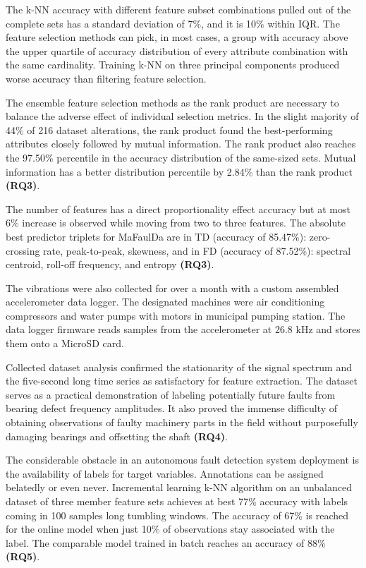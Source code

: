 The k-NN accuracy with different feature subset combinations pulled out of the complete sets has a standard deviation of 7\%, and it is 10\% within IQR. The feature selection methods can pick, in most cases, a group with accuracy above the upper quartile of accuracy distribution of every attribute combination with the same cardinality. Training k-NN on three principal components produced worse accuracy than filtering feature selection.

The ensemble feature selection methods as the rank product are necessary to balance the adverse effect of individual selection metrics. In the slight majority of 44\% of 216 dataset alterations, the rank product found the best-performing attributes closely followed by mutual information. The rank product also reaches the 97.50\% percentile in the accuracy distribution of the same-sized sets. Mutual information has a better distribution percentile by 2.84\% than the rank product \textbf{(RQ3)}. 

The number of features has a direct proportionality effect accuracy but at most 6\% increase is observed while moving from two to three features. The absolute best predictor triplets for MaFaulDa are in TD (accuracy of 85.47\%): zero-crossing rate, peak-to-peak, skewness, and in FD (accuracy of 87.52\%): spectral centroid, roll-off frequency, and entropy \textbf{(RQ3)}.

The vibrations were also collected for over a month with a custom assembled accelerometer data logger. The designated machines were air conditioning compressors and water pumps with motors in municipal pumping station. The data logger firmware reads samples from the accelerometer at 26.8 kHz and stores them onto a MicroSD card.

Collected dataset analysis confirmed the stationarity of the signal spectrum and the five-second long time series as satisfactory for feature extraction. The dataset serves as a practical demonstration of labeling potentially future faults from bearing defect frequency amplitudes. It also proved the immense difficulty of obtaining observations of faulty machinery parts in the field without purposefully damaging bearings and offsetting the shaft \textbf{(RQ4)}.

The considerable obstacle in an autonomous fault detection system deployment is the availability of labels for target variables. Annotations can be assigned belatedly or even never. Incremental learning k-NN algorithm on an unbalanced dataset of three member feature sets achieves at best 77\% accuracy with labels coming in 100 samples long tumbling windows. The accuracy of 67\% is reached for the online model when just 10\% of observations stay associated with the label. The comparable model trained in batch reaches an accuracy of 88\% \textbf{(RQ5)}.

